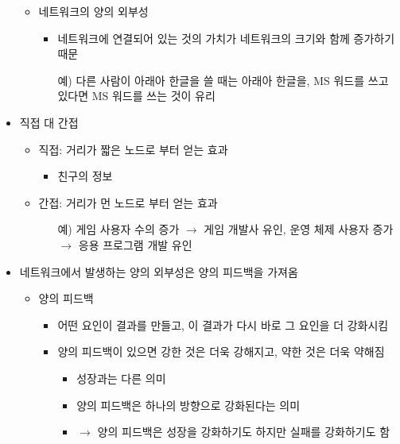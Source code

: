 \begin{itemize}
\begin{itemize}
\begin{itemize}
		\end{itemize}
	\item 네트워크의 양의 외부성
		\begin{itemize}
		\item 네트워크에 연결되어 있는 것의 가치가 네트워크의 크기와 함께 증가하기 때문		
		\item[예)] 다른 사람이 아래아 한글을 쓸 때는 아래아 한글을, MS 워드를 쓰고 있다면 MS 워드를 쓰는 것이 유리
		\end{itemize}
	\end{itemize}
\item 직접 대 간접
	\begin{itemize}
	\item 직접: 거리가 짧은 노드로 부터 얻는 효과
		\begin{itemize}
		\item 친구의 정보
		\end{itemize}
	\item 간접:  거리가 먼 노드로 부터 얻는 효과
		\begin{itemize}
		\item[예)] 게임 사용자 수의 증가 $\rightarrow$ 게임 개발사 유인, 운영 체제 사용자 증가 $\rightarrow$ 응용 프로그램 개발 유인
		\end{itemize}
	\end{itemize}
\item 네트워크에서 발생하는 양의 외부성은 양의 피드백을 가져옴	
	\begin{itemize}
	\item 양의 피드백
		\begin{itemize}
		\item 어떤 요인이 결과를 만들고, 이 결과가 다시 바로 그 요인을 더 강화시킴
		\item 양의 피드백이 있으면 강한 것은 더욱 강해지고, 약한 것은 더욱 약해짐
			\begin{itemize}
			\item 성장과는 다른 의미
			\item 양의 피드백은 하나의 방향으로 강화된다는 의미
			\item $\rightarrow$ 양의 피드백은 성장을 강화하기도 하지만 실패를 강화하기도 함
			\end{itemize}
		\end{itemize}
	\end{itemize}
\end{itemize}

